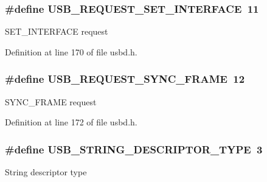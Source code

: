 \subsubsection[{\texorpdfstring{U\+S\+B\+\_\+\+R\+E\+Q\+U\+E\+S\+T\+\_\+\+S\+E\+T\+\_\+\+I\+N\+T\+E\+R\+F\+A\+CE}{USB_REQUEST_SET_INTERFACE}}]{\setlength{\rightskip}{0pt plus 5cm}\#define U\+S\+B\+\_\+\+R\+E\+Q\+U\+E\+S\+T\+\_\+\+S\+E\+T\+\_\+\+I\+N\+T\+E\+R\+F\+A\+CE~11}\hypertarget{group__USBD__Core_gaf8d2ea632916bfc2a7628f63d3f643aa}{}\label{group__USBD__Core_gaf8d2ea632916bfc2a7628f63d3f643aa}
S\+E\+T\+\_\+\+I\+N\+T\+E\+R\+F\+A\+CE request 

Definition at line 170 of file usbd.\+h.

\subsubsection[{\texorpdfstring{U\+S\+B\+\_\+\+R\+E\+Q\+U\+E\+S\+T\+\_\+\+S\+Y\+N\+C\+\_\+\+F\+R\+A\+ME}{USB_REQUEST_SYNC_FRAME}}]{\setlength{\rightskip}{0pt plus 5cm}\#define U\+S\+B\+\_\+\+R\+E\+Q\+U\+E\+S\+T\+\_\+\+S\+Y\+N\+C\+\_\+\+F\+R\+A\+ME~12}\hypertarget{group__USBD__Core_ga916e1a4b8f8a5cb369d896ef35c4db34}{}\label{group__USBD__Core_ga916e1a4b8f8a5cb369d896ef35c4db34}
S\+Y\+N\+C\+\_\+\+F\+R\+A\+ME request 

Definition at line 172 of file usbd.\+h.

\subsubsection[{\texorpdfstring{U\+S\+B\+\_\+\+S\+T\+R\+I\+N\+G\+\_\+\+D\+E\+S\+C\+R\+I\+P\+T\+O\+R\+\_\+\+T\+Y\+PE}{USB_STRING_DESCRIPTOR_TYPE}}]{\setlength{\rightskip}{0pt plus 5cm}\#define U\+S\+B\+\_\+\+S\+T\+R\+I\+N\+G\+\_\+\+D\+E\+S\+C\+R\+I\+P\+T\+O\+R\+\_\+\+T\+Y\+PE~3}\hypertarget{group__USBD__Core_gab01c9c74f2eb266b20aecd48bab4b35c}{}\label{group__USBD__Core_gab01c9c74f2eb266b20aecd48bab4b35c}
String descriptor type 

